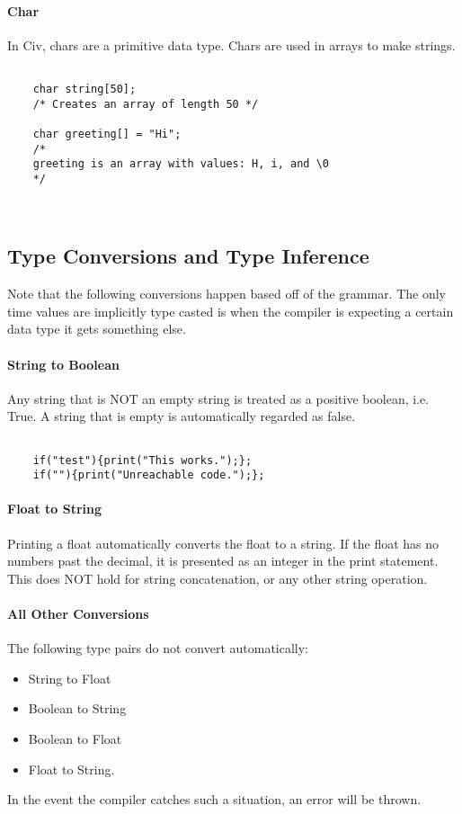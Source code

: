 \documentclass[a4paper]{article}
\begin{document}
\paragraph{Char}
In Civ, chars are a primitive data type. Chars are used in arrays to make strings. 

{\selectfont
\begin{lstlisting}

	char string[50];
	/* Creates an array of length 50 */
    
	char greeting[] = "Hi";
	/* 
	greeting is an array with values: H, i, and \0
	*/
    
    
\end{lstlisting}
}

\subsection{Type Conversions and Type Inference}
Note that the following conversions happen based off of the grammar. The only time values are implicitly type casted is when the compiler is expecting a certain data type it gets something else.

\paragraph{String to Boolean}
Any string that is NOT an empty string is treated as a positive boolean, i.e. True. A string that is empty is automatically regarded as false.

{\selectfont
\begin{lstlisting}

	if("test"){print("This works.");};
	if(""){print("Unreachable code.");};
\end{lstlisting}
}

\paragraph{Float to String}
Printing a float automatically converts the float to a string. If the float has no numbers past the decimal, it is presented as an integer in the print statement. This does NOT hold for string concatenation, or any other string operation.

\paragraph{All Other Conversions}
The following type pairs do not convert automatically:
\begin{itemize}
\item{String to Float}
\item{Boolean to String}
\item{Boolean to Float}
\item{Float to String}.
\end{itemize}
In the event the compiler catches such a situation, an error will be thrown.
\end{document}

